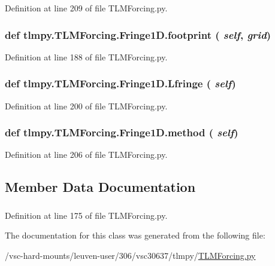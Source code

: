 Definition at line 209 of file TLMForcing.py.\hypertarget{classtlmpy_1_1TLMForcing_1_1Fringe1D_a4568a76835f764c2e7c10fec879a04ac}{
\subsubsection[{footprint}]{\setlength{\rightskip}{0pt plus 5cm}def tlmpy.TLMForcing.Fringe1D.footprint ( {\em self}, \/   {\em grid})}}
\label{classtlmpy_1_1TLMForcing_1_1Fringe1D_a4568a76835f764c2e7c10fec879a04ac}


Definition at line 188 of file TLMForcing.py.\hypertarget{classtlmpy_1_1TLMForcing_1_1Fringe1D_a4b760d0c54335a9c5f53d5e393084198}{
\subsubsection[{Lfringe}]{\setlength{\rightskip}{0pt plus 5cm}def tlmpy.TLMForcing.Fringe1D.Lfringe ( {\em self})}}
\label{classtlmpy_1_1TLMForcing_1_1Fringe1D_a4b760d0c54335a9c5f53d5e393084198}


Definition at line 200 of file TLMForcing.py.\hypertarget{classtlmpy_1_1TLMForcing_1_1Fringe1D_a615590ffa3f72efb0c5002dd3c7c4194}{
\subsubsection[{method}]{\setlength{\rightskip}{0pt plus 5cm}def {\bf tlmpy.TLMForcing.Fringe1D.method} ( {\em self})}}
\label{classtlmpy_1_1TLMForcing_1_1Fringe1D_a615590ffa3f72efb0c5002dd3c7c4194}


Definition at line 206 of file TLMForcing.py.

\subsection{Member Data Documentation}
\hypertarget{classtlmpy_1_1TLMForcing_1_1Fringe1D_ae3c921a1946098bf6167cd15f9bbdaf9}{
\subsubsection[{method}]{}}
\label{classtlmpy_1_1TLMForcing_1_1Fringe1D_ae3c921a1946098bf6167cd15f9bbdaf9}


Definition at line 175 of file TLMForcing.py.

The documentation for this class was generated from the following file:\begin{DoxyCompactItemize}
\item 
/vsc-\/hard-\/mounts/leuven-\/user/306/vsc30637/tlmpy/\hyperlink{TLMForcing_8py}{TLMForcing.py}\end{DoxyCompactItemize}
